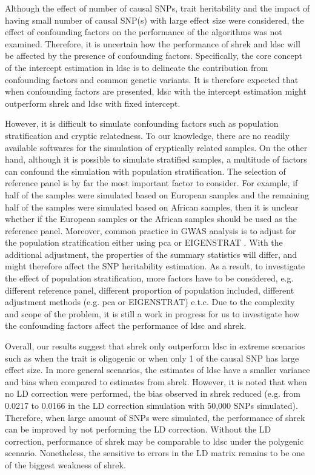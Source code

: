 	Although the effect of number of causal \glspl{SNP}, trait heritability and the impact of having small number of causal \gls{SNP}(s) with large effect size were considered, the effect of confounding factors on the performance of the algorithms was not examined.
	Therefore, it is uncertain how the performance of \gls{shrek} and \gls{ldsc} will be affected by the presence of confounding factors.
	Specifically, the core concept of the intercept estimation in \gls{ldsc} is to delineate the contribution from confounding factors and common genetic variants.
	It is therefore expected that when confounding factors are presented, \gls{ldsc} with the intercept estimation might outperform \gls{shrek} and \gls{ldsc} with fixed intercept.
	
	However, it is difficult to simulate confounding factors such as population stratification and cryptic relatedness.
	To our knowledge, there are no readily available softwares for the simulation of cryptically related samples.
	On the other hand, although it is possible to simulate stratified samples, a multitude of factors can confound the simulation with population stratification.
	The selection of reference panel is by far the most important factor to consider. 
	For example, if half of the samples were simulated based on European samples and the remaining half of the samples were simulated based on African samples, then it is unclear whether if the European samples or the African samples should be used as the reference panel.
	Moreover, common practice in \gls{GWAS} analysis is to adjust for the population stratification either using \gls{pca} or EIGENSTRAT \citep{Price2006}.
	With the additional adjustment, the properties of the summary statistics will differ, and might therefore affect the \gls{SNP} heritability estimation.
	As a result, to investigate the effect of population stratification, more factors have to be considered, e.g. different reference panel, different proportion of population included, different adjustment methods (e.g. \gls{pca} or EIGENSTRAT) e.t.c.
	Due to the complexity and scope of the problem, it is still a work in progress for us to investigate how the confounding factors affect the performance of \gls{ldsc} and \gls{shrek}.
		
	Overall, our results suggest that \gls{shrek} only outperform \gls{ldsc} in extreme scenarios such as when the trait is oligogenic or when only 1 of the causal \gls{SNP} has large effect size.
	In more general scenarios, the estimates of \gls{ldsc} have a smaller variance and bias when compared to estimates from \gls{shrek}.
	However, it is noted that when no \gls{LD} correction were performed, the bias observed in \gls{shrek} reduced (e.g. from 0.0217 to 0.0166 in the \gls{LD} correction simulation with 50,000 \glspl{SNP} simulated).
	Therefore, when large amount of \glspl{SNP} were simulated, the performance of \gls{shrek} can be improved by not performing the \gls{LD} correction.
	Without the \gls{LD} correction, performance of \gls{shrek} may be comparable to \gls{ldsc} under the polygenic scenario.
	Nonetheless, the sensitive to errors in the \gls{LD} matrix remains to be one of the biggest weakness of \gls{shrek}.
	
